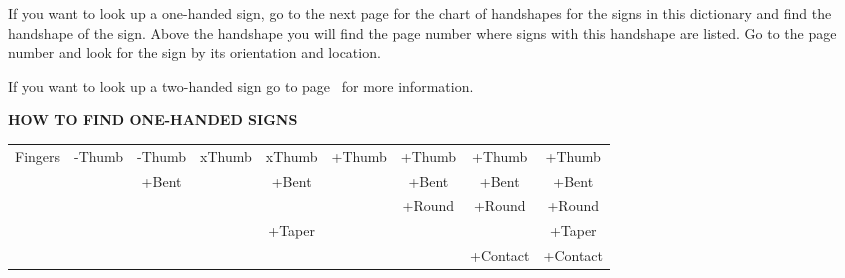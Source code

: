 \documentclass{tufte-book}
\begin{document}
\begin{fullwidth}
If you want to look up a one-handed sign, go to the next page for the chart of handshapes for the signs in this dictionary and find the handshape of the sign. Above the handshape you will find the page number where signs with this handshape are listed. Go to the page number and look for the sign by its orientation and location.

If you want to look up a two-handed sign go to page~\pageref{page:twohandinfo} for more information.


\end{fullwidth}
\newpage
\begin{fullwidth}
\begin{center}

{\large \textbf{HOW TO FIND ONE-HANDED SIGNS}}
\end{center}

\begin{table}[h!]
\begin{center}
\begin{tabular}{|c|c|c|c|c|c|c|c|c|}
\hline
\footnotesize Fingers &\footnotesize -Thumb &\footnotesize -Thumb &\footnotesize xThumb&\footnotesize xThumb&\footnotesize+Thumb&\footnotesize +Thumb&\footnotesize +Thumb&  \footnotesize +Thumb  \\
& &\footnotesize +Bent  &&\footnotesize +Bent&&\footnotesize +Bent&\footnotesize +Bent&  \footnotesize +Bent\\
 & & &&&&\footnotesize +Round&\footnotesize +Round&  \footnotesize +Round  \\
 & & &&\footnotesize +Taper&&&&  \footnotesize +Taper \\
&&&&&&&\footnotesize +Contact&  \footnotesize +Contact  \\


\end{tabular}
\end{center}
\end{table}
\end{fullwidth}
\end{document}
